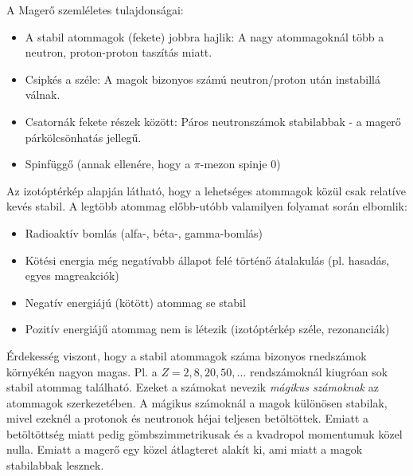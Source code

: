 \documentclass[../main.tex]{subfiles}
\begin{document}
A Magerő szemléletes tulajdonságai:
\begin{itemize}
    \item A stabil atommagok (fekete) jobbra hajlik: A nagy atommagoknál több a neutron, proton-proton taszítás miatt.
    \item Csipkés a széle: A magok bizonyos számú neutron/proton után instabillá válnak.
    \item Csatornák fekete részek között: Páros neutronszámok stabilabbak - a magerő párkölcsönhatás jellegű.
    \item Spinfüggő (annak ellenére, hogy a $\pi$-mezon spinje 0)
\end{itemize}

Az izotóptérkép alapján látható, hogy a lehetséges atommagok közül csak relatíve kevés stabil. A legtöbb atommag előbb-utóbb valamilyen folyamat során elbomlik:
\begin{itemize}
    \item Radioaktív bomlás (alfa-, béta-, gamma-bomlás)
    \item Kötési energia még negatívabb állapot felé történő átalakulás (pl. hasadás, egyes magreakciók)
    \item Negatív energiájú (kötött) atommag se stabil
    \item Pozitív energiájű atommag nem is létezik (izotóptérkép széle, rezonanciák)
\end{itemize}

Érdekesség viszont, hogy a stabil atommagok száma bizonyos rnedszámok környékén nagyon magas. Pl. a $Z=2, 8, 20, 50, \ldots$ rendszámoknál kiugróan sok stabil atommag található. 
Ezeket a számokat nevezik \textit{mágikus számoknak} az atommagok szerkezetében. A mágikus számoknál a magok különösen stabilak, mivel ezeknél a protonok és neutronok héjai teljesen betöltöttek.
Emiatt a betöltöttség miatt pedig gömbszimmetrikusak és a kvadropol momentumuk közel nulla. Emiatt a magerő egy közel átlagteret alakít ki, ami miatt a magok stabilabbak lesznek.
\end{document}
